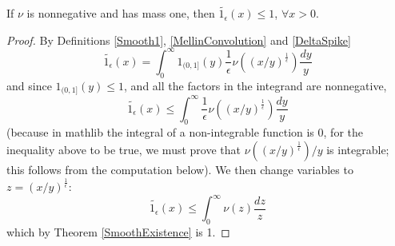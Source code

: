 \begin{lemma}
\label{Smooth1LeOne}
\leanok
If $\nu$ is nonnegative and has mass one, then $\widetilde{1_{\epsilon}}(x)\le 1$, $\forall x>0$.
\end{lemma}
\begin{proof}
\leanok
By Definitions \ref{Smooth1}, \ref{MellinConvolution} and \ref{DeltaSpike}
  $$
    \widetilde{1_\epsilon}(x)
    =\int_0^\infty 1_{(0,1]}(y)\frac1\epsilon\nu((x/y)^{\frac1\epsilon}) \frac{dy}y
  $$
  and since $1_{(0,1]}(y)\le 1$, and all the factors in the integrand are nonnegative,
  $$
    \widetilde{1_\epsilon}(x)\le\int_0^\infty \frac1\epsilon\nu((x/y)^{\frac1\epsilon}) \frac{dy}y
  $$
  (because in mathlib the integral of a non-integrable function is $0$, for the inequality above
  to be true, we must prove that $\nu((x/y)^{\frac1\epsilon})/y$ is integrable; this follows from
  the computation below).
  We then change variables to $z=(x/y)^{\frac1\epsilon}$:
  $$
    \widetilde{1_\epsilon}(x)\le\int_0^\infty \nu(z) \frac{dz}z
  $$
  which by Theorem \ref{SmoothExistence} is 1.
\end{proof}
